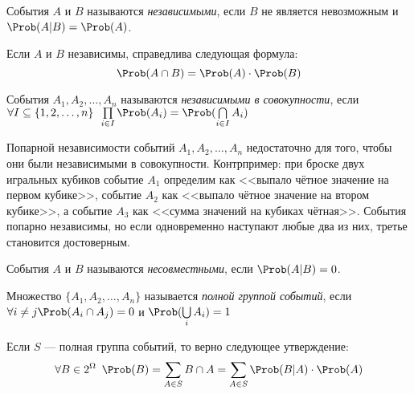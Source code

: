 \documentclass[a4paper, 12pt]{article}
\begin{document}
    \begin{definition}
        События \(A\) и \(B\) называются \textit{независимыми}, если \(B\) не является невозможным и \(\Prob(A | B) = \Prob(A)\).
    \end{definition}

    Если \(A\) и \(B\) независимы, справедлива следующая формула:
    \[ \Prob(A \cap B) = \Prob(A) \cdot \Prob(B) \]

    \begin{definition}
        События \(A_1, A_2, \ldots, A_n\) называются \textit{независимыми в совокупности}, если\\
        \(\forall I \subseteq \{1, 2, \ldots, n\} \enspace \prod\limits_{i \in I} \Prob(A_i) = \Prob(\bigcap\limits_{i \in I} A_i)\)
    \end{definition}

    \begin{remark}
        Попарной независимости событий \(A_1, A_2, \ldots, A_n\) недостаточно для того, чтобы они были независимыми в совокупности. Контрпример: при броске двух игральных кубиков событие \(A_1\) определим как <<выпало чётное значение на первом кубике>>, событие \(A_2\) как <<выпало чётное значение на втором кубике>>, а событие \(A_3\) как <<сумма значений на кубиках чётная>>. События попарно независимы, но если одновременно наступают любые два из них, третье становится достоверным.
    \end{remark}

    \begin{definition}
        События \(A\) и \(B\) называются \textit{несовместными}, если \(\Prob(A | B) = 0\).
    \end{definition}

    \begin{definition}
        Множество \(\{A_1, A_2, \ldots, A_n\} \) называется \textit{полной группой событий}, если\\
        \(\forall i \neq j \Prob(A_i \cap A_j) = 0\) и \(\Prob(\bigcup\limits_{i} A_i) = 1\)
    \end{definition}

    Если \(S\) --- полная группа событий, то верно следующее утверждение:
    \[
        \forall B \in 2^\Omega \enspace \Prob(B) = \sum_{A \in S} B \cap A = \sum_{A \in S} \Prob(B | A) \cdot \Prob(A)
    \]
\end{document}
